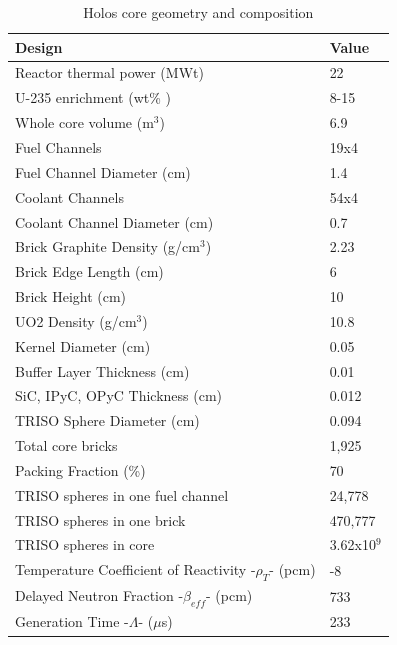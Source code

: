 \begin{table} [htbp]
\begin{center}

\caption{Holos core geometry and composition}
\label{Holostable}
\begin{tabular}{l     l}
\hline 
Design 		&Value \\ 
\hline 
Reactor thermal power (MWt)&22                                             \\
U-235 enrichment (wt\% )&8-15             \\
Whole core volume (m$^3$)&6.9                                        \\
\hline 
Fuel Channels&19x4                      \\
Fuel Channel Diameter (cm)&1.4            \\
Coolant Channels&54x4                   \\
Coolant Channel Diameter (cm)&0.7               \\
Brick Graphite Density (g/cm$^3$)&2.23              \\
Brick Edge Length (cm)&6               \\
Brick Height (cm)&10             \\
\hline 
UO2 Density  (g/cm$^3$) & 10.8                       \\
Kernel Diameter  (cm) & 0.05                       \\
Buffer Layer Thickness  (cm) & 0.01            \\
SiC, IPyC, OPyC Thickness  (cm) & 0.012   \\
TRISO Sphere Diameter  (cm) & 0.094         \\
Total core bricks & 1,925                           \\
Packing Fraction (\%) & 70                       \\
\hline 
TRISO spheres in one fuel channel  &24,778   \\
TRISO spheres in one brick            &470,777 \\
TRISO spheres in core  &3.62x10$^{9}$            \\
\hline 
Temperature Coefficient of Reactivity -$\rho_{T}$- (pcm)&-8       \\
Delayed Neutron Fraction -$\beta_{eff}$- (pcm)&733      \\
Generation Time -$\Lambda$- ($\mu$s)&233                        \\
\hline 

\end{tabular}
\end{center}
\end{table}

